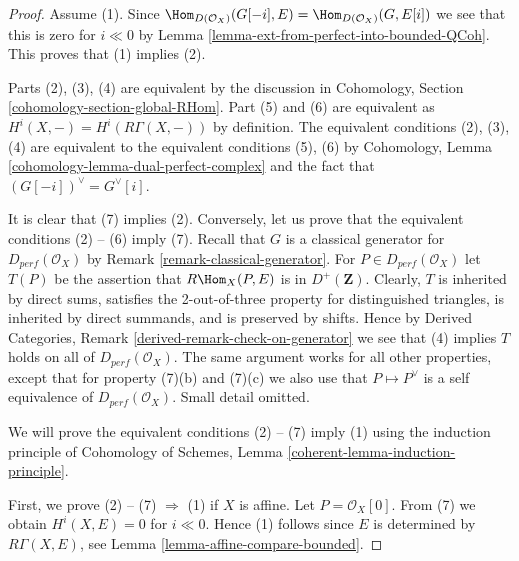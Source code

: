 \begin{proof}
Assume (1). Since
$\Hom_{D(\mathcal{O}_X)}(G[-i], E) = \Hom_{D(\mathcal{O}_X)}(G, E[i])$
we see that this is zero for $i \ll 0$ by
Lemma \ref{lemma-ext-from-perfect-into-bounded-QCoh}. This proves
that (1) implies (2).

\medskip\noindent
Parts (2), (3), (4) are equivalent by the discussion in
Cohomology, Section \ref{cohomology-section-global-RHom}.
Part (5) and (6) are equivalent as $H^i(X, -) = H^i(R\Gamma(X, -))$
by definition. The equivalent conditions (2), (3), (4) are
equivalent to the equivalent conditions (5), (6) by
Cohomology, Lemma \ref{cohomology-lemma-dual-perfect-complex}
and the fact that $(G[-i])^\vee = G^\vee[i]$.

\medskip\noindent
It is clear that (7) implies (2). Conversely, 
let us prove that the equivalent conditions (2) -- (6) imply (7).
Recall that $G$ is a  classical generator for $D_{perf}(\mathcal{O}_X)$ by
Remark \ref{remark-classical-generator}.
For $P \in D_{perf}(\mathcal{O}_X)$ let $T(P)$ be the assertion that
$R\Hom_X(P, E)$ is in $D^+(\mathbf{Z})$.
Clearly, $T$ is inherited by direct sums,
satisfies the 2-out-of-three property for distinguished
triangles, is inherited by direct summands, and is preserved by shifts.
Hence by Derived Categories, Remark \ref{derived-remark-check-on-generator}
we see that (4) implies $T$ holds on all of $D_{perf}(\mathcal{O}_X)$.
The same argument works for all other properties, except that for property
(7)(b) and (7)(c) we also use that $P \mapsto P^\vee$ is a self
equivalence of $D_{perf}(\mathcal{O}_X)$. Small detail omitted.

\medskip\noindent
We will prove the equivalent conditions (2) -- (7) imply (1)
using the induction principle of
Cohomology of Schemes, Lemma \ref{coherent-lemma-induction-principle}.

\medskip\noindent
First, we prove (2) -- (7) $\Rightarrow$ (1) if $X$ is affine.
Let $P = \mathcal{O}_X[0]$. From (7) we obtain $H^i (X, E) = 0$
for $i \ll 0$. Hence (1) follows since $E$ is
determined by $R\Gamma (X, E)$, see Lemma \ref{lemma-affine-compare-bounded}.


\end{proof}
